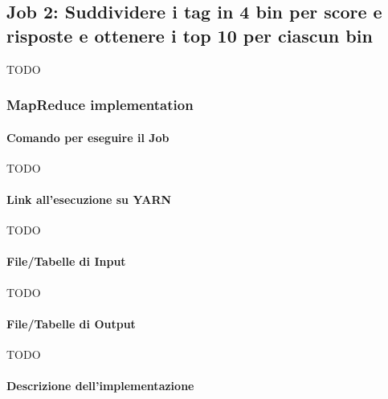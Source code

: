

\subsection[%
    Job 2: Suddividere tag in base a score e risposte%
  ]{%
    Job 2: Suddividere i tag in 4 bin per score e risposte e ottenere i top 10 per ciascun bin%
  }\label{subsec:job2}

  TODO

  \subsubsection{MapReduce implementation}\label{subsub:job2:mapreduce}

  \paragraph{Comando per eseguire il Job}\label{par:job2:mapreduce:cmd}

  TODO

  \paragraph{Link all'esecuzione su YARN}\label{par:job2:mapreduce:yarn}

  TODO

  \paragraph{File/Tabelle di Input}\label{par:job2:mapreduce:input}

  TODO

  \paragraph{File/Tabelle di Output}\label{par:job2:mapreduce:output}

  TODO

  \paragraph{Descrizione dell'implementazione}\label{par:job2:mapreduce:implementation}

